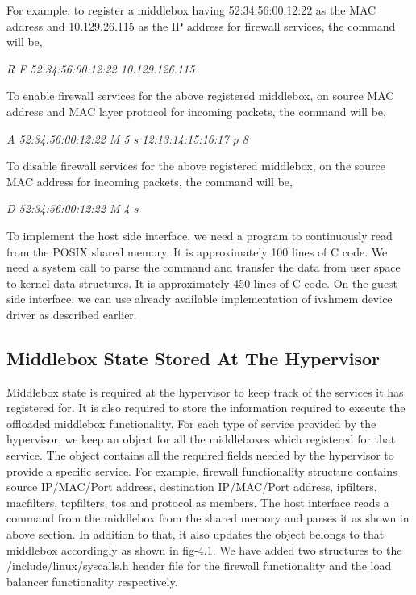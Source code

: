 \documentclass[a4paper,11pt]{report}
\begin{document}
For example, to register a middlebox having 52:34:56:00:12:22 as the MAC address and 10.129.26.115 as the IP address for firewall services, the command will be,
\begin{center} 
\textit{R F 52:34:56:00:12:22 10.129.126.115}
\end{center} 
To enable firewall services for the above registered middlebox, on source MAC address and MAC layer protocol for incoming packets, the command will be,
\begin{center} 
\textit{A 52:34:56:00:12:22 M 5 s 12:13:14:15:16:17 p 8}
\end{center} 
To disable firewall services for the above registered middlebox, on the source MAC address for incoming packets, the command will be,
\begin{center} 
\textit{D 52:34:56:00:12:22 M 4 s}
\end{center} 

To implement the host side interface, we need a program to continuously read from the POSIX shared memory. It is approximately 100 lines of C code. We need a system call to parse the command and transfer the data from user space to kernel data structures. It is approximately 450 lines of C code. On the guest side interface, we can use already available implementation of ivshmem device driver\cite{IV} as described earlier.       
\subsection{Middlebox State Stored At The Hypervisor}
Middlebox state is required at the hypervisor to keep track of the services it has registered for. It is also required to store the information required to execute the offloaded middlebox functionality. For each type of service provided by the hypervisor, we keep an object for all the middleboxes which registered for that service. The object contains all the required fields needed by the hypervisor to provide a specific service. For example, firewall functionality structure contains source IP/MAC/Port address, destination IP/MAC/Port address, ipfilters, macfilters, tcpfilters, tos and protocol as members. The host interface reads a command from the middlebox from the shared memory and parses it as shown in above section. In addition to that, it also updates the object belongs to that middlebox accordingly as shown in fig-4.1. We have added two structures to the /include/linux/syscalls.h header file for the firewall functionality and the load balancer functionality respectively.    
\end{document}
